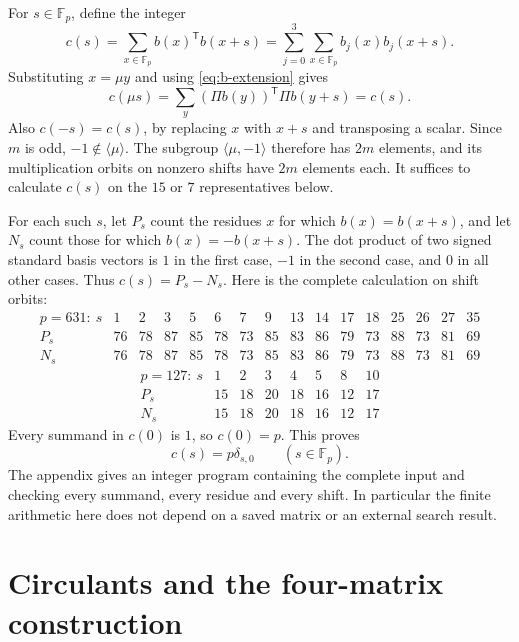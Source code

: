 \documentclass[10pt]{article}
\newcommand{\F}{\mathbb F}
\begin{document}
For $s\in\F_p$, define the integer
\begin{equation}\label{eq:c-def}
 c(s)=\sum_{x\in\F_p} b(x)^{\mathsf T}b(x+s)
     =\sum_{j=0}^3\sum_{x\in\F_p}b_j(x)b_j(x+s).
\end{equation}
Substituting $x=\mu y$ and using \eqref{eq:b-extension} gives
\[
 c(\mu s)=\sum_y (\Pi b(y))^{\mathsf T}\Pi b(y+s)=c(s).
\]
Also $c(-s)=c(s)$, by replacing $x$ with $x+s$ and transposing a scalar.
Since $m$ is odd, $-1\notin\langle\mu\rangle$. The subgroup
$\langle\mu,-1\rangle$ therefore has $2m$ elements, and its multiplication
orbits on nonzero shifts have $2m$ elements each.
It suffices to calculate $c(s)$ on the $15$ or $7$ representatives below.

For each such $s$, let $P_s$ count the residues $x$ for which
$b(x)=b(x+s)$, and let $N_s$ count those for which $b(x)=-b(x+s)$.
The dot product of two signed standard basis vectors is $1$ in the first
case, $-1$ in the second case, and $0$ in all other cases.
Thus $c(s)=P_s-N_s$. Here is the complete calculation on shift orbits:
\[
\begin{array}{c|rrrrrrrrrrrrrrr}
p=631:\ s&1&2&3&5&6&7&9&13&14&17&18&25&26&27&35\\\hline
P_s&76&78&87&85&78&73&85&83&86&79&73&88&73&81&69\\
N_s&76&78&87&85&78&73&85&83&86&79&73&88&73&81&69
\end{array}
\]
\[
\begin{array}{c|rrrrrrr}
p=127:\ s&1&2&3&4&5&8&10\\\hline
P_s&15&18&20&18&16&12&17\\
N_s&15&18&20&18&16&12&17
\end{array}
\]
Every summand in $c(0)$ is $1$, so $c(0)=p$. This proves
\begin{equation}\label{eq:T}
 c(s)=p\delta_{s,0}\qquad(s\in\F_p).
\end{equation}
The appendix gives an integer program containing the complete input and
checking every summand, every residue and every shift. In particular the
finite arithmetic here does not depend on a saved matrix or an external
search result.

\section{Circulants and the four-matrix construction}\label{sec:design}
\end{document}
